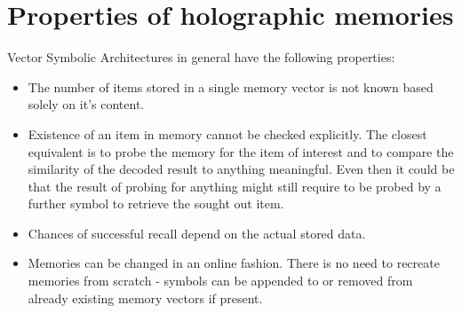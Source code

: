 \documentclass[conference]{IEEEtran}
\begin{document}
	\section{Properties of holographic memories}
	
	Vector Symbolic Architectures in general have the following properties:
	\begin{itemize}
		\item The number of items stored in a single memory vector is not known based solely on it's content.
		\item Existence of an item in memory cannot be checked explicitly. The closest equivalent is to probe the memory for the item of interest and to compare the similarity of the decoded result to anything meaningful. Even then it could be that the result of probing for anything might still require to be probed by a further symbol to retrieve the sought out item.
		\item Chances of successful recall depend on the actual stored data.
		\item Memories can be changed in an online fashion. There is no need to recreate memories from scratch - symbols can be appended to or removed from already existing memory vectors if present.
	\end{itemize}
	
\end{document}
